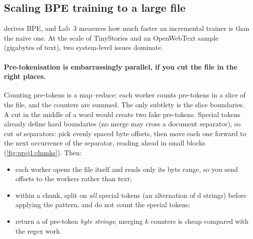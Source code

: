 \subsection{Scaling BPE training to a large file}\label{sec:proj1:bpe}

 derives BPE, and Lab~3 measures how much faster an incremental trainer is than
the naive one. At the scale of TinyStories and an OpenWebText sample (gigabytes of text), two
system-level issues dominate.

\paragraph{Pre-tokenisation is embarrassingly parallel, if you cut the file in the right
places.} Counting pre-tokens is a map--reduce: each worker counts pre-tokens in a slice of the
file, and the counters are summed. The only subtlety is the slice boundaries. A cut in the middle
of a word would create two fake pre-tokens. Special tokens already define hard boundaries (no merge
may cross a document separator), so cut \emph{at} separators: pick evenly spaced byte
offsets, then move each one forward to the next occurrence of the separator, reading ahead in
small blocks (\cref{fig:proj1:chunks}). Then:
\begin{itemize}
  \item each worker opens the file itself and reads only its byte range, so you send offsets to
        the workers rather than text;
  \item within a chunk, split on \emph{all} special tokens (an alternation of
        d strings) before applying the pattern, and do not count the special
        tokens;
  \item return a  of pre-token \emph{byte strings}; merging $k$ counters is cheap
        compared with the regex work.
\end{itemize}

